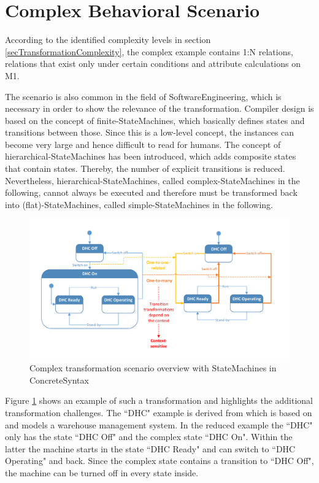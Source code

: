 \section{Complex Behavioral Scenario}\label{secM2MScenarioBehavioralComplex}

According to the identified complexity levels in section \ref{secTransformationComplexity}, the complex example contains 1:N relations, relations that exist only under certain conditions and attribute calculations on M1.

The scenario is also common in the field of \gls{SoftwareEngineering}, which is necessary in order to show the relevance of the transformation. Compiler design is based on the concept of finite-\glspl{StateMachine}, which basically defines states and transitions between those. Since this is a low-level concept, the instances can become very large and hence difficult to read for humans. The concept of hierarchical-\glspl{StateMachine} has been introduced, which adds composite states that contain states. Thereby, the number of explicit transitions is reduced. Nevertheless, hierarchical-\glspl{StateMachine}, called complex-\glspl{StateMachine} in the following, cannot always be executed and therefore must be transformed back into (flat)-\glspl{StateMachine}, called simple-\glspl{StateMachine} in the following.

\begin{figure}[htb]
	\centering
	\includegraphics[scale=0.6, trim=0cm 1cm 0cm 1cm, clip=true]{Images/ScenarioBehavioralStateMachineTransformationOverview.pdf} 
	\caption{Complex transformation scenario overview with \glspl{StateMachine} in \gls{ConcreteSyntax}}
	\label{figScenarioBehavioralStateMachineTransformationOverview}
\end{figure}

Figure \ref{figScenarioBehavioralStateMachineTransformationOverview} shows an example of such a transformation and highlights the additional transformation challenges. The ``DHC" example is derived from \cite{Gerth2014} which is based on \cite{Engels2004} and models a warehouse management system. In the reduced example the ``DHC" only has the state ``DHC Off" and the complex state ``DHC On". Within the latter the machine starts in the state ``DHC Ready" and can switch to ``DHC Operating" and back. Since the complex state contains a transition to ``DHC Off", the machine can be turned off in every state inside.

